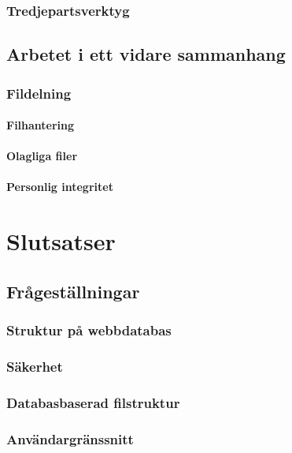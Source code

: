 \documentclass[a4paper,12pt,oneside,final]{extbook}
\begin{document}
\subsection{Tredjepartsverktyg}

\section{Arbetet i ett vidare sammanhang}

\subsection{Fildelning}

\subsubsection{Filhantering}

\subsubsection{Olagliga filer}

\subsubsection{Personlig integritet}

\chapter{Slutsatser}

\section{Frågeställningar}

\subsection{Struktur på webbdatabas}

\subsection{Säkerhet}

\subsection{Databasbaserad filstruktur}

\subsection{Användargränssnitt}
\end{document}
